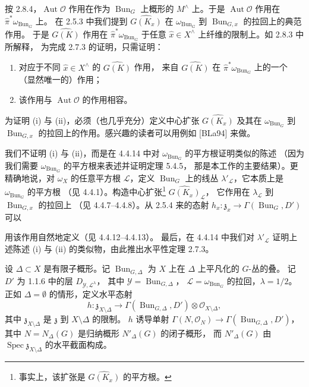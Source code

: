  按 2.8.4，$\operatorname{Aut}\mathcal{O}$ 作用在作为
$\operatorname{Bun}_G$ 上概形的 $M^\wedge$ 上。于是 $\operatorname{Aut}\mathcal{O}$
作用在 $\hat{\pi}^*\omega_{\operatorname{Bun}_G}$ 上。
在 2.5.3 中我们提到 $\widehat{G(K_x)}$ 在 $\omega_{\operatorname{Bun}_G}$
到 $\operatorname{Bun}_{G,x}$ 的拉回上的典范作用。
于是 $\widehat{G(K)}$ 作用在 $\hat{\pi}^*\omega_{\operatorname{Bun}_G}$
于任意 $\hat{x}\in X^\wedge$ 上纤维的限制上。如 2.8.3 中所解释，
为完成 2.7.3 的证明，只需证明：
\begin{enumerate}[label=(\roman*),leftmargin=2.6em]
\item 对应于不同 $\hat{x}\in X^\wedge$ 的 $\widehat{G(K)}$ 作用，
  来自 $\widehat{G(K)}$ 在 $\hat{\pi}^*\omega_{\operatorname{Bun}_G}$ 上的一个
  （显然唯一的）作用；
\item 该作用与 $\operatorname{Aut}\mathcal{O}$ 的作用相容。
\end{enumerate}
为证明 (i) 与 (ii)，必须（也几乎充分）定义中心扩张 $\widehat{G(K_x)}$
及其在 $\omega_{\operatorname{Bun}_G}$ 到 $\operatorname{Bun}_{G,x}$
的拉回上的作用。感兴趣的读者可以用例如 [BLa94] 来做。

我们不证明 (i) 与 (ii)，而是在 4.4.14 中对
$\omega_{\operatorname{Bun}_G}$ 的平方根证明类似的陈述
（因为我们需要 $\omega_{\operatorname{Bun}_G}$ 的平方根来表述并证明定理 5.4.5，
那是本工作的主要结果）。更精确地说，对 $\omega_X$ 的任意平方根
$\mathcal{L}$，定义 $\operatorname{Bun}_G$ 上的线丛
$\lambda'_{\mathcal{L}}$，它本质上是 $\omega_{\operatorname{Bun}_G}$ 的平方根
（见 4.4.1）。构造中心扩张\footnote{事实上，该扩张是
$\widehat{G(K_x)}$ 的平方根。} $\widehat{G(K_x)}_{\mathcal{L}}$，
它作用在 $\lambda_{\mathcal{L}}$ 到 $\operatorname{Bun}_{G,x}$ 的拉回上
（见 4.4.7--4.4.8）。从 2.5.4 来的态射
$h_x:\mathfrak{z}_x\to\Gamma(\operatorname{Bun}_G,D')$ 可以


用该作用自然地定义（见 4.4.12--4.4.13）。
最后，在 4.4.14 中我们对 $\lambda'_{\mathcal{L}}$ 证明上述陈述 (i) 与 (ii)
的类似物，由此推出水平性定理 2.7.3。

 设 $\Delta\subset X$ 是有限子概形。记
$\operatorname{Bun}_{G,\Delta}$ 为 $X$ 上在 $\Delta$ 上平凡化的 $G$-丛的叠。
记 $D'$ 为 1.1.6 中的层 $D_{\mathcal{Y},\mathcal{L}^{\lambda}}$，
其中 $\mathcal{Y}=\operatorname{Bun}_{G,\Delta}$，
$\mathcal{L}=\omega_{\operatorname{Bun}_G}$ 的拉回，$\lambda=1/2$。
正如 $\Delta=\emptyset$ 的情形，定义水平态射
\[
  h:\mathfrak{z}_{X\setminus\Delta}\longrightarrow
  \Gamma(\operatorname{Bun}_{G,\Delta},D')\otimes\mathcal{O}_{X\setminus\Delta},
\]
其中 $\mathfrak{z}_{X\setminus\Delta}$ 是 $\mathfrak{z}$ 到 $X\setminus\Delta$ 的限制。
$h$ 诱导单射 $\Gamma(N,\mathcal{O}_N)\to\Gamma(\operatorname{Bun}_{G,\Delta},D')$，
其中 $N=N_\Delta(G)$ 是归纳概形 $N'_\Delta(G)$ 的闭子概形，
而 $N'_\Delta(G)$ 由 $\operatorname{Spec}\mathfrak{z}_{X\setminus\Delta}$
的水平截面构成。

